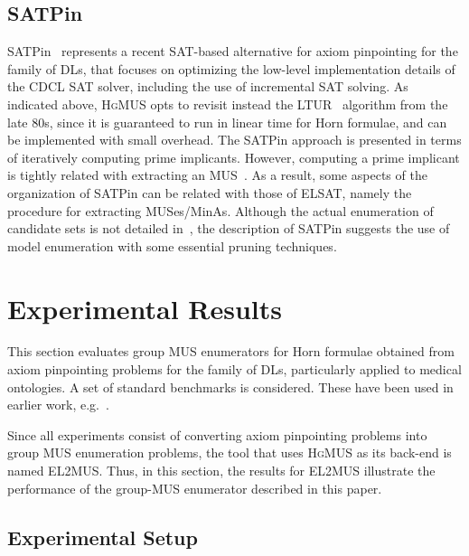 \documentclass{llncs}
\newcommand{\elplain}{\xspace}
\newcommand{\hgmus}{\textsc{HgMUS}\xspace}
\newcommand{\elsat}{ELSAT\xspace}
\begin{document}
\subsection{SATPin}

SATPin~\cite{mp-tr15} represents a recent SAT-based alternative for
axiom pinpointing for the \elplain family of DLs, that focuses on
optimizing the low-level implementation details of the CDCL SAT
solver, including the use of incremental SAT solving. As indicated
above, \hgmus opts to revisit instead the LTUR~\cite{minoux-ipl88}
algorithm from the late 80s, since it is guaranteed to run in linear
time for Horn formulae, and can be implemented with small overhead.
The SATPin approach is presented in terms of iteratively computing
prime implicants. However, computing a prime implicant is tightly
related with extracting an MUS~\cite{bradley-fmcad07}. As a result,
some aspects of the organization of SATPin can be related with those
of \elsat, namely the procedure for extracting MUSes/MinAs.
Although the actual enumeration of candidate sets is not detailed
in~\cite{mp-tr15}, the description of SATPin suggests the use of model
enumeration with some essential pruning techniques.


\section{Experimental Results} \label{sec:res}

This section evaluates group MUS enumerators for Horn formulae
obtained from axiom pinpointing problems for the \elplain family of
DLs, particularly applied to medical ontologies. 
A set of standard benchmarks is considered. These have been used in
earlier
work,
e.g.~\cite{baader-ijcar06,sebastiani-cade09,ludwig-ore14,ams-corr15,mp-tr15}.

Since all experiments consist of converting axiom pinpointing problems
into group MUS enumeration problems, the tool that uses \hgmus as its
back-end is named EL2MUS. Thus, in this section, the results for
EL2MUS illustrate the performance of the group-MUS enumerator
described in this paper.


\subsection{Experimental Setup}
\end{document}
